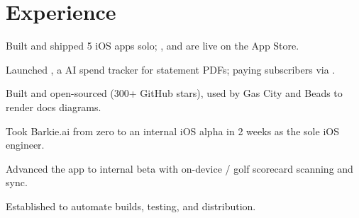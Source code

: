 \documentclass{fonts}
\begin{document}
%
%


\section{}
\vspace{-17pt}
\raggedright
{}


\section{Experience}
\textbf{}
\begin{tightemize}
    \item Built and shipped 5 iOS apps solo; ,  and  are live on the App Store.
    \item Launched \underline{\href{https://apps.apple.com/us/app/ai-spend-tracker-retrobudget/id6743363764}{}}, a  AI spend tracker for statement PDFs; paying subscribers via .
    \item Built and open-sourced \underline{\href{https://github.com/swiftlysingh/excalidraw-cli}{}} (300+ GitHub stars), used by Gas City and Beads to render docs diagrams.
\end{tightemize}

\textbf{}
\begin{tightemize}
    \item Took Barkie.ai from zero to an internal iOS alpha in 2 weeks as the sole iOS engineer.
    \item Advanced the app to internal beta with on-device / golf scorecard scanning and  sync.
    \item Established  to automate builds, testing, and  distribution.
\end{tightemize}
\end{document}
